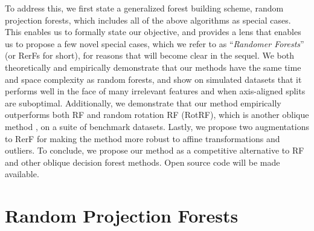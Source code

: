 \documentclass[10pt]{article}
\begin{document}
To address this, we first state a generalized forest building scheme, random projection forests, which includes all of the above algorithms as special cases. This enables us to formally state our objective, and provides a lens that enables us to propose a few novel special cases, which we refer to as ``{\em{Randomer Forests}}'' (or RerFs for short), for reasons that will become clear in the sequel. We both theoretically and empirically demonstrate that our methods have the same time and space complexity as random forests, and show on simulated datasets that it performs well in the face of many irrelevant features and when axis-aligned splits are suboptimal. Additionally, we demonstrate that our method empirically outperforms both RF and random rotation RF (RotRF), which is another oblique method \cite{Blaser2015}, on a suite of benchmark datasets. Lastly, we propose two augmentations to RerF for making the method more robust to affine transformations and outliers. To conclude, we propose our method as a competitive alternative to RF and other oblique decision forest methods. Open source code will be made available.

\section{Random Projection Forests}
\end{document}
